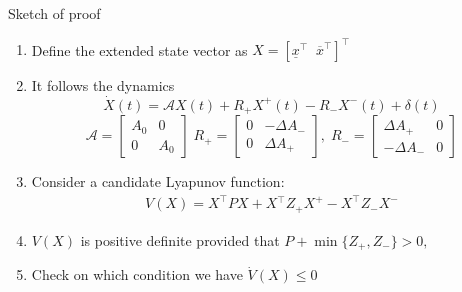 \documentclass[slideopt,A4,showboxes,svgnames]{beamer}
\begin{document}
\begin{frame}{Sketch of proof}
\begin{enumerate}
	\item Define the extended state vector as $X=[\underline{x}^{\top}\;\;\overline{x}^{\top}]^{\top}$
	\item It follows the dynamics $$\dot{X}(t)=\mathcal{A}X(t)+R_{+}X^{+}(t)-R_{-}X^{-}(t)+\delta(t)$$
	$$\mathcal{A}=\left[\begin{array}{cc}
    A_{0} & 0\\
    0 & A_{0}
    \end{array}\right]
    	\;R_{+}=\left[\begin{array}{cc}
    0 & -\Delta A_{-}\\
    0 & \Delta A_{+}
    \end{array}\right],\;R_{-}=\left[\begin{array}{cc}
    \Delta A_{+} & 0\\
    -\Delta A_{-} & 0
    \end{array}\right]$$
	\item Consider a candidate Lyapunov function:
	\begin{gather*}
	V(X)=X^{\top}PX+X{}^{\top}Z_{+}X^{+}-X^{\top}Z_{-}X^{-}
	\end{gather*}
	\item $V(X)$ is positive definite provided that
	$
	P+\min\{Z_{+},Z_{-}\}>0,
	$
	\item Check on which condition we have $\dot{V}(X) \leq 0$
\end{enumerate}
\end{frame}
\end{document}
